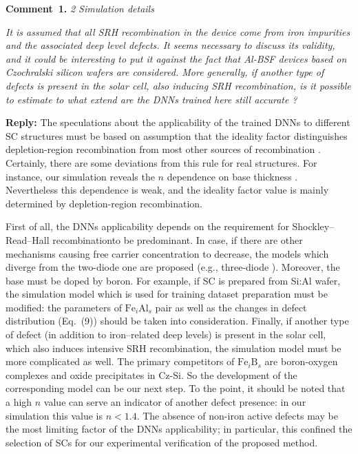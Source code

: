 \documentclass[num-refs]{wiley-article} %
\begin{document}
\textcolor[rgb]{0.00,0.50,1.00}{\textbf{Comment~1.}}
\emph{2 Simulation details}

\emph{It is assumed that all SRH recombination in the device come from iron impurities and the associated deep level defects.
It seems necessary to discuss its validity, and it could be interesting to put it against the fact that Al-BSF devices based on Czochralski silicon wafers are considered.
More generally, if another type of defects is present in the solar cell, also inducing SRH recombination,
is it possible to estimate to what extend are the DNNs trained here still accurate ? }

\vspace{0.5cm}
\noindent
\textcolor[rgb]{0.51,0.00,0.00}{\textbf{Reply:}}
The speculations about the applicability of the trained DNNs to different SC structures
must be based on assumption that the ideality factor distinguishes
depletion-region recombination from most other sources of recombination \cite{Breitenstein2013,n2McIntosh}.
Certainly, there are some deviations from this rule for real structures.
For instance, our simulation reveals the $n$ dependence on base thickness \cite{OlikhJPS}.
Nevertheless this dependence is weak, and the ideality factor value is mainly determined
by depletion-region recombination.

First of all, the DNNs applicability depends on the requirement for Shockley–Read–Hall recombinationto be predominant.
In case,
if there are other mechanisms causing free carrier concentration to decrease,
the models which diverge from the two-diode one are proposed
(e.g., three-diode \cite{TreeDiode,Shah}).
Moreover, the base must be doped by boron.
For example, if SC is prepared from Si:Al wafer,
the simulation model which is used for training dataset preparation must be modified:
the parameters of $\mathrm{Fe}_i\mathrm{Al}_s$ pair as well as
the changes in defect distribution (Eq.~(9)) should be taken into consideration.
Finally, if another type of defect (in addition to iron--related deep levels)
is present in the solar cell, which also induces intensive SRH recombination,
the simulation model must be more complicated as well.
The primary competitors of $\mathrm{Fe}_i\mathrm{B}_s$  are  boron-oxygen complexes \cite{LIDRev,LIDRev2}
and oxide precipitates \cite{MurphySC2014,Oxide:Chen} in Cz-Si.
So the development of the corresponding model can be our next step.
To the point, it should be noted that a high $n$ value can serve an indicator of another defect presence:
in our simulation this value is $n<1.4$.
The absence of non-iron active defects may be the most limiting factor of the DNNs applicability;
in particular, this confined the selection of SCs for our experimental verification of the proposed method.
\end{document}
